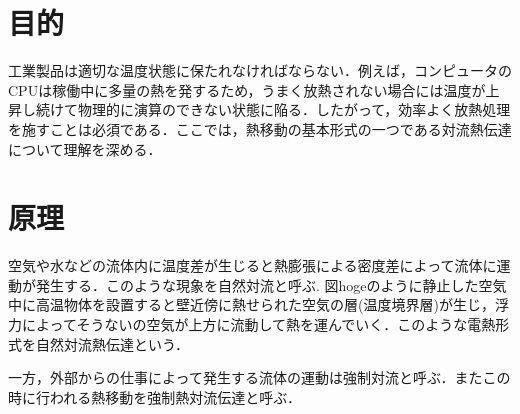 \documentclass[a4paper,11pt,uplatex]{jsarticle}
\begin{document}
\section{目的}
工業製品は適切な温度状態に保たれなければならない．例えば，コンピュータのCPUは稼働中に多量の熱を発するため，うまく放熱されない場合には温度が上昇し続けて物理的に演算のできない状態に陥る．したがって，効率よく放熱処理を施すことは必須である．ここでは，熱移動の基本形式の一つである対流熱伝達について理解を深める．
\section{原理}
空気や水などの流体内に温度差が生じると熱膨張による密度差によって流体に運動が発生する．このような現象を自然対流と呼ぶ.
図hogeのように静止した空気中に高温物体を設置すると壁近傍に熱せられた空気の層(温度境界層)が生じ，浮力によってそうないの空気が上方に流動して熱を運んでいく．このような電熱形式を自然対流熱伝達という．
\par
一方，外部からの仕事によって発生する流体の運動は強制対流と呼ぶ．またこの時に行われる熱移動を強制熱対流伝達と呼ぶ．
\end{document}
